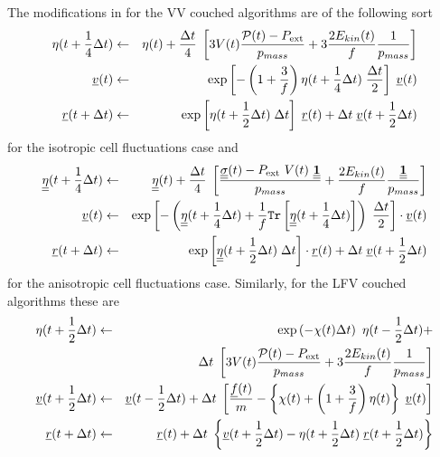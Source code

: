 The modifications in for the VV couched algorithms
are of the following sort
\begin{eqnarray}
\eta (t + {1 \over 4} \Delta t) &\leftarrow& \eta (t) + {\Delta t \over 4} \;
\left[ 3 V(t) \frac{{\cal P}(t) - P_{\rm ext}}{p_{mass}} +
3 \frac{2 E_{kin}(t)}{f} \frac{1}{p_{mass}} \right] \nonumber \\
\mbox{$\underline{v}$}(t) &\leftarrow& \exp \left[ -\left( 1 + \frac{3}{f} \right)
\eta (t + {1 \over 4}\Delta t) \; {\Delta t \over 2} \right] \; \mbox{$\underline{v}$}(t) \\
\mbox{$\underline{r}$}(t + \Delta t) &\leftarrow& \exp \left[ \eta (t + {1 \over 2} \Delta t) \; \Delta t \right] \;
\mbox{$\underline{r}$}(t) + \Delta t \; \mbox{$\underline{v}$}(t + {1 \over 2} \Delta t) \nonumber
\end{eqnarray}
for the isotropic cell fluctuations case and
\begin{eqnarray}
\mbox{$\underline{\underline{\bf \eta}}$}(t + {1 \over 4} \Delta t) &\leftarrow& \mbox{$\underline{\underline{\bf \eta}}$}(t) +
{\Delta t \over 4} \; \left[ \frac{\mbox{$\underline{\underline{\bf \sigma}}$}(t) - P_{\rm ext}~V(t)~\mbox{$\underline{\underline{\bf 1}}$}}{p_{mass}} +
\frac{2 E_{kin}(t)}{f} \frac{\mbox{$\underline{\underline{\bf 1}}$}}{p_{mass}} \right] \nonumber \\
\mbox{$\underline{v}$}(t) &\leftarrow& \exp \left[ -\left( \mbox{$\underline{\underline{\bf \eta}}$}(t + {1 \over 4}\Delta t) +
\frac{1}{f} {\tt Tr}\left[\mbox{$\underline{\underline{\bf \eta}}$}(t + {1 \over 4}\Delta t)\right] \right) \;
{\Delta t \over 2} \right] \cdot \mbox{$\underline{v}$}(t) \\
\mbox{$\underline{r}$}(t + \Delta t) &\leftarrow& \exp \left[ \mbox{$\underline{\underline{\bf \eta}}$} (t + {1 \over 2} \Delta t) \; \Delta t \right] \cdot
\mbox{$\underline{r}$}(t) + \Delta t \; \mbox{$\underline{v}$}(t + {1 \over 2} \Delta t) \nonumber
\end{eqnarray}
for the anisotropic cell fluctuations case.  Similarly, for the LFV
couched algorithms these are
\begin{eqnarray}
\eta (t + {1 \over 2} \Delta t) &\leftarrow& \exp \left( -\chi (t) \Delta t \right) ~ \eta (t - {1 \over 2} \Delta t) + \nonumber \\
&& \Delta t \; \left[ 3 V(t) \frac{{\cal P}(t) - P_{\rm ext}}{p_{mass}} +
3 \frac{2 E_{kin}(t)}{f} \frac{1}{p_{mass}} \right] \nonumber \\
\mbox{$\underline{v}$}(t + {1 \over 2} \Delta t) &\leftarrow& \mbox{$\underline{v}$}(t - {1 \over 2} \Delta t) + \Delta t \;
\left[{\mbox{$\underline{f}$}(t) \over m} - \left\{ \chi (t) + \left( 1 + \frac{3}{f} \right)\eta (t)\right\} \;
\mbox{$\underline{v}$}(t) \right] \\
\mbox{$\underline{r}$}(t + \Delta t) &\leftarrow& \mbox{$\underline{r}$}(t) + \Delta t \;
\left\{ \mbox{$\underline{v}$}(t + {1 \over 2} \Delta t) - \eta (t + {1 \over 2} \Delta t) \;
\mbox{$\underline{r}$}(t + {1 \over 2} \Delta t) \right\} \nonumber
\end{eqnarray}
